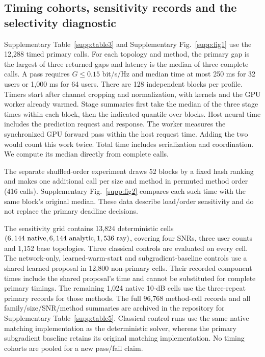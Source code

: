 \documentclass[10pt,letterpaper]{article}
\begin{document}
\subsection{Timing cohorts, sensitivity records and the selectivity diagnostic}
Supplementary Table~\ref{supp:table3} and Supplementary Fig.~\ref{supp:fig1} use the 12,288 timed
primary calls. For each topology and method, the primary gap is the
largest of three returned gaps and latency is the median of three
complete calls. A pass requires \(G\le0.15\) bit/s/Hz and median time
at most 250 ms for 32 users or 1,000 ms for 64 users.
There are 128 independent blocks per profile. Timers start after channel
cropping and normalization, with kernels and the GPU worker already warmed.
Stage summaries first take
the median of the three stage times within each block, then the indicated
quantile over blocks. Host neural time includes the prediction request
and response. The worker measures the synchronized GPU forward pass within the host request time. Adding the two would count this work twice. Total time includes serialization and coordination. We compute its median directly from complete calls.

The separate shuffled-order experiment draws 52 blocks by a fixed hash
ranking and makes one additional call per size and method in permuted
method order (416 calls). Supplementary Fig.~\ref{supp:fig2} compares each such time
with the same block's original median. These data describe load/order
sensitivity and do not replace the primary deadline decisions.

The sensitivity grid contains 13,824 deterministic cells
\((6,144\ {\rm native},6,144\ {\rm analytic},1,536\ {\rm ray})\),
covering four SNRs, three user counts and 1,152 base topologies.
Three classical controls are evaluated on every cell.
The network-only, learned-warm-start and subgradient-baseline controls use a shared learned
proposal in 12,800 non-primary cells. Their recorded component times include
the shared proposal's time and cannot be substituted for complete primary
timings. The remaining 1,024 native 10-dB cells use the three-repeat
primary records for those methods. The full 96,768 method-cell records
and all family/size/SNR/method summaries are archived in the repository for
Supplementary Table~\ref{supp:table5}. Classical control runs use the same native
matching implementation as the deterministic solver, whereas the primary
subgradient baseline retains its original matching implementation.
No timing cohorts are pooled for a new pass/fail claim.
\end{document}
